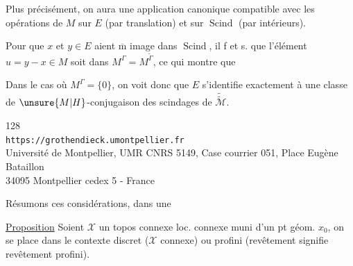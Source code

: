 Plus précisément, on aura une application canonique
compatible avec les opérations de $M$ sur $E$ (par translation) et sur $\operatorname{Scind}$ (par    intérieurs).

Pour que $x$ et $y\in E$ aient $\overline{\mathrm m}$ image dans $\operatorname{Scind}$, il f et s. que l'élément $u=y-x\in M$ soit dans $M^\Gamma=M^{\widetilde\Gamma}$, ce qui montre que
\diagram{
\[
\begin{tikzcd}[column sep=large,row sep=large]
\text{l'hom }E \arrow[r,no head] & \operatorname{Scind}\text{ est injectif} \\
& \text{sss}\quad M^\Gamma=\{0\}\quad .
\end{tikzcd}
\tag{286}
\]
}

Dans le cas où $M^\Gamma=\{0\}$, on voit donc que $E$ s'identifie exactement à une classe de $\unsure{M|H}$-conjugaison des scindages de $\widetilde{\widetilde{\mathcal M}}$.


\begin{center}
\small
128\\
\texttt{https://grothendieck.umontpellier.fr}\\
Université de Montpellier, UMR CNRS 5149, Case courrier 051, Place Eugène Bataillon\\
34095 Montpellier cedex 5 - France
\end{center}


Résumons ces considérations, dans une

\uline{Proposition} Soient $\mathcal X$ un topos  connexe loc. connexe muni d'un pt géom. $x_0$, on se place dans le contexte discret ($\mathcal X$   connexe) ou profini (revêtement signifie revêtement profini).

